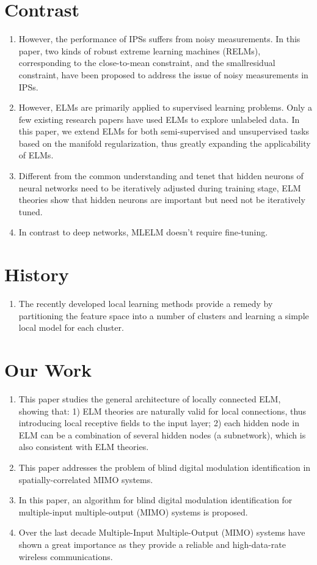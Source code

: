 \documentclass[onecolumn,conference]{IEEEtran}
\begin{document}
\section{Contrast}
\begin{enumerate}
\item However, the performance of IPSs suffers from noisy measurements. In this paper, two kinds of robust extreme learning machines (RELMs), corresponding to the close-to-mean constraint, and the smallresidual constraint, have been proposed to address the issue of noisy measurements in IPSs. \cite{Lu2016}
\item However, ELMs are primarily applied to supervised learning problems. Only a few existing research papers have used ELMs to explore unlabeled data. In this paper, we extend ELMs for both semi-supervised and unsupervised tasks based on the manifold regularization, thus greatly expanding the applicability of ELMs. \cite{Huang2014}
\item Different from the common understanding and tenet that hidden neurons of neural networks need to be iteratively adjusted during training stage, ELM theories show that hidden neurons are important but need not be iteratively tuned. \cite{Huang2015}
\item In contrast to deep networks, MLELM doesn’t require fine-tuning.\cite{Kasun2013}
\end{enumerate}
\section{History}
\begin{enumerate}
\item The recently developed local learning methods provide a remedy by partitioning the feature space into a number of clusters and learning a simple local model for each cluster. \cite{Zhang2016}
\end{enumerate}
\section{Our Work}
\begin{enumerate}
\item This paper studies the general architecture of locally connected ELM, showing that: 1) ELM theories are naturally valid for local connections, thus introducing local receptive fields to the input layer; 2) each hidden node in ELM can be a combination of several hidden nodes (a subnetwork), which is also consistent with ELM theories.\cite{Huang2015}
\item This paper
addresses the problem of blind digital modulation identification in spatially-correlated MIMO systems. \cite{HassanFebruary2012}
\item In this paper, an algorithm for blind digital modulation identification for multiple-input multiple-output (MIMO) systems is proposed. \cite{HassanFebruary2012}
\item Over the last decade Multiple-Input Multiple-Output (MIMO) systems have shown a great importance as they provide a reliable and high-data-rate wireless communications. \cite{HassanFebruary2012}
\end{enumerate}
\end{document}
